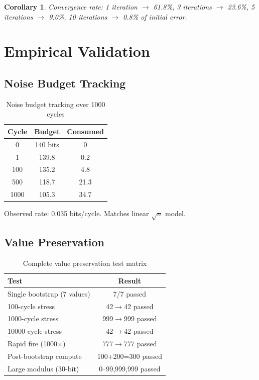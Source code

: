 \documentclass[11pt,a4paper]{article}
\newtheorem{corollary}[theorem]{Corollary}
\begin{document}
\begin{corollary}
Convergence rate: 1 iteration $\to$ 61.8\%, 3 iterations $\to$ 23.6\%, 5 iterations $\to$ 9.0\%, 10 iterations $\to$ 0.8\% of initial error.
\end{corollary}

\section{Empirical Validation}

\subsection{Noise Budget Tracking}

\begin{table}[H]
\centering
\begin{tabular}{ccc}
\toprule
\textbf{Cycle} & \textbf{Budget} & \textbf{Consumed} \\
\midrule
0 & 140 bits & 0 \\
1 & 139.8 & 0.2 \\
100 & 135.2 & 4.8 \\
500 & 118.7 & 21.3 \\
1000 & 105.3 & 34.7 \\
\bottomrule
\end{tabular}
\caption{Noise budget tracking over 1000 cycles}
\end{table}

Observed rate: 0.035 bits/cycle. Matches linear $\sqrt{n}$ model.

\subsection{Value Preservation}

\begin{table}[H]
\centering
\begin{tabular}{lc}
\toprule
\textbf{Test} & \textbf{Result} \\
\midrule
Single bootstrap (7 values) & 7/7 passed \\
100-cycle stress & 42$\to$42 passed \\
1000-cycle stress & 999$\to$999 passed \\
10000-cycle stress & 42$\to$42 passed \\
Rapid fire (1000$\times$) & 777$\to$777 passed \\
Post-bootstrap compute & 100+200=300 passed \\
Large modulus (30-bit) & 0--99,999,999 passed \\
\bottomrule
\end{tabular}
\caption{Complete value preservation test matrix}
\end{table}
\end{document}
